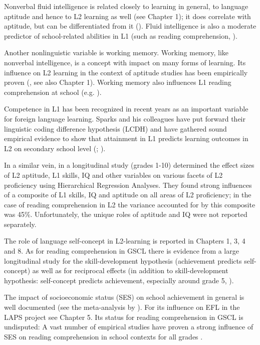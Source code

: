 \documentclass[output=paper]{langsci/langscibook}
\begin{document}
Nonverbal fluid intelligence is related closely to learning in general, to language aptitude and hence to L2 learning as well (see Chapter 1); it does correlate with aptitude, but can be differentiated from it (\citealt{SparksEtAl2012}). Fluid intelligence is also a moderate predictor of school-related abilities in L1 (such as reading comprehension, \citealt{PengEtAl2019}).

Another nonlinguistic variable is working memory. Working memory, like nonverbal intelligence, is a concept with impact on many forms of learning. Its influence on L2 learning in the context of aptitude studies has been empirically proven (\citealt{WenEtAl2017}, see also Chapter 1). Working memory also influences L1 reading comprehension at school (e.g. \citealt{PengEtAl2017}).

Competence in L1 has been recognized in recent years as an important variable for foreign language learning. Sparks and his colleagues have put forward their linguistic coding difference hypothesis (LCDH) and have gathered sound empirical evidence to show that attainment in L1 predicts learning outcomes in L2 on secondary school level (\citealt{SparksEtAl2012}; \citealt{Li2016}).

In a similar vein, in a longitudinal study (grades 1-10) \citet{SparksEtAl2012} determined the effect sizes of L2 aptitude, L1 skills, IQ and other variables on various facets of L2 proficiency using Hierarchical Regression Analyses. They found strong influences of a composite of L1 skills, IQ and aptitude on all areas of L2 proficiency; in the case of reading comprehension in L2 the variance accounted for by this composite was 45\%. Unfortunately, the unique roles of aptitude and IQ were not reported separately. 

The role of language self-concept in L2-learning is reported in Chapters 1, 3, 4 and 8. As for reading comprehension in GSCL there is evidence from a large longitudinal study for the skill-development hypothesis (achievement predicts self-concept) as well as for reciprocal effects (in addition to skill-development hypothesis: self-concept predicts achievement, especially around grade 5, \citealt{RetelsdorfEtAl2014}).

The impact of socioeconomic status (SES) on school achievement in general is well documented (see the meta-analysis by \citealt{Sirin2005}). For its influence on EFL in the LAPS project see Chapter 5. Its status for reading comprehension in GSCL is undisputed: A vast number of empirical studies have proven a strong influence of SES on reading comprehension in school contexts for all grades \citep{Schaffner2009}.
\end{document}
